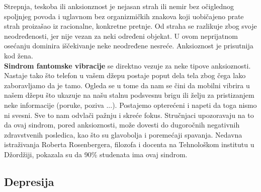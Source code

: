 \documentclass[a4paper]{article}
\begin{document}
{		Strepnja, teskoba ili anksionznost je nejasan strah ili nemir bez očiglednog spoljnjeg povoda i uglavnom bez organizmičkih znakova koji uobičajeno prate strah proizašao iz racionalne, konkretne pretnje. Od straha se razlikuje zbog svoje neodređenosti, jer nije vezan za neki određeni objekat. U ovom neprijatnom osećanju dominira iščekivanje neke neodređene nesreće. Anksioznost je prisutnija kod žena. \\
		\textbf{Sindrom fantomske vibracije} se direktno vezuje za neke tipove anksioznosti. Nastaje tako što telefon u vašem džepu postaje poput dela tela zbog čega lako zaboravljamo da je tamo. Ogleda se u tome da nam se čini da mobilni vibrira u našem džepu što ukazuje na našu stalnu podsvesnu brigu ili želju za pristizanjem neke informacije (poruke, poziva ...). Postajemo opterećeni i napeti da toga nismo ni svesni. Sve to nam odvlači pažnju i skreće fokus. Stručnjaci upozoravaju na to da ovaj sindrom, pored anksioznosti, može dovesti do dugoročnih negativnih zdravstvenih posledica, kao što su glavobolja i poremećaji spavanja. Nedavna istraživanja Roberta Rosenbergera, filozofa i docenta na Tehnološkom institutu u Džordžiji, pokazala su da 90\% studenata ima ovaj sindrom.
		
		\subsection{Depresija}
		\label{subsec:depresija}
		
}
\end{document}
